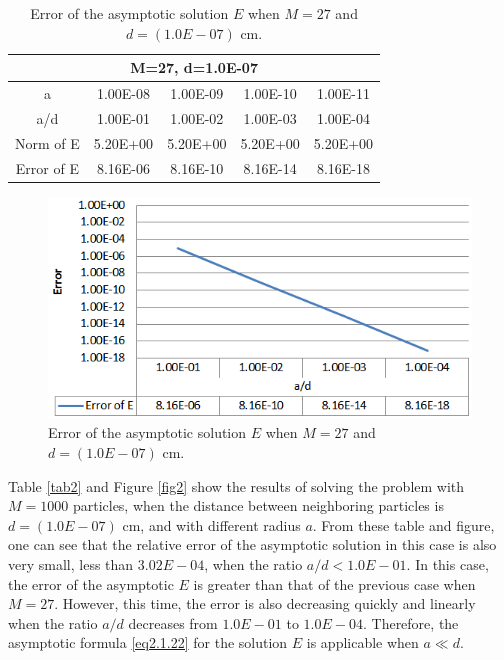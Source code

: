 \documentclass[12pt]{article}
\numberwithin{equation}{section}
\begin{document}
\begin{table}[htbp]
  \centering
  \caption{Error of the asymptotic solution $E$ when $M=27$ and $d=(1.0E-07)$ cm.}
    \begin{tabular}{ccccc}
      \toprule
        \multicolumn{5}{c}{M=27, d=1.0E-07} \\
      \midrule
		a     & 1.00E-08 & 1.00E-09 & 1.00E-10 & 1.00E-11 \\
	    a/d   & 1.00E-01 & 1.00E-02 & 1.00E-03 & 1.00E-04 \\
	    Norm of E & 5.20E+00 & 5.20E+00 & 5.20E+00 & 5.20E+00 \\
	    Error of E & 8.16E-06 & 8.16E-10 & 8.16E-14 & 8.16E-18 \\
      \bottomrule
    \end{tabular}%
  \label{tab1}%
\end{table}%
\begin{figure}[htbp]
    \centering
    \includegraphics[scale=0.95]{M27}
    \caption{Error of the asymptotic solution $E$ when $M=27$ and $d=(1.0E-07)$ cm.}
    \label{fig1}
\end{figure}

Table \ref{tab2} and Figure \ref{fig2} show the results of solving the problem with $M=1000$ particles, when the distance between neighboring particles is $d=(1.0E-07)$ cm, and with different radius $a$. From these table and figure, one can see that the relative error of the asymptotic solution in this case is also very small, less than $3.02E-04$, when the ratio $a/d < 1.0E-01$. In this case, the error of the asymptotic $E$ is greater than that of the previous case when $M=27$. However, this time, the error is also decreasing quickly and linearly when the ratio $a/d$ decreases from $1.0E-01$ to $1.0E-04$. Therefore, the asymptotic formula \eqref{eq2.1.22} for the solution $E$ is applicable when $a \ll d$.
\end{document}
